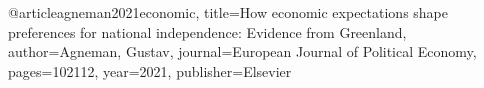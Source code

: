 @article{agneman2021economic,
  title={How economic expectations shape preferences for national independence: Evidence from Greenland},
  author={Agneman, Gustav},
  journal={European Journal of Political Economy},
  pages={102112},
  year={2021},
  publisher={Elsevier}
}